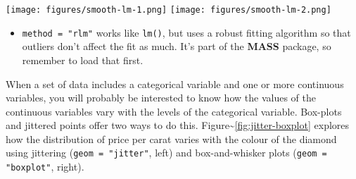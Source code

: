 \begin{Shaded}
\begin{Highlighting}[]
  \NormalTok{(}\NormalTok{, }\NormalTok{), }
   \NormalTok{)}
  \NormalTok{(}\NormalTok{, }\NormalTok{), }
   \NormalTok{, } \StringTok{ }\NormalTok{))}
\end{Highlighting}
\end{Shaded}

\texttt{[image: figures/smooth-lm-1.png]}
\texttt{[image: figures/smooth-lm-2.png]}

\begin{itemize}
\itemsep1pt\parskip0pt
\item
  \texttt{method = "rlm"} works like \texttt{lm()}, but uses a robust
  fitting algorithm so that outliers don't affect the fit as much. It's
  part of the \textbf{MASS} package, so remember to load that first.
   
\end{itemize}


When a set of data includes a categorical variable and one or more
continuous variables, you will probably be interested to know how the
values of the continuous variables vary with the levels of the
categorical variable. Box-plots and jittered points offer two ways to do
this. Figure\textasciitilde{}\ref{fig:jitter-boxplot} explores how the
distribution of price per carat varies with the colour of the diamond
using jittering (\texttt{geom = "jitter"}, left) and box-and-whisker
plots (\texttt{geom = "boxplot"}, right). 
 

\begin{Shaded}
\begin{Highlighting}[]
\StringTok{ }  \NormalTok{)}
\StringTok{ }  \NormalTok{)}
\end{Highlighting}
\end{Shaded}

